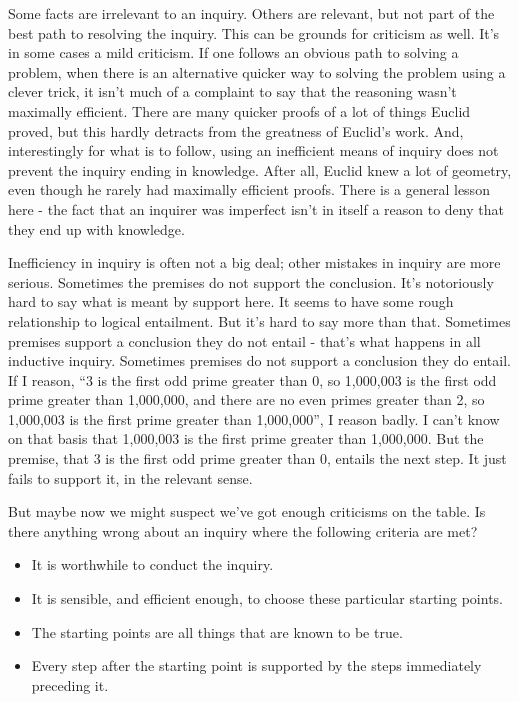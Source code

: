 \documentclass[
  11pt,
]{book}
\providecommand{\tightlist}{%
  \setlength{\itemsep}{0pt}\setlength{\parskip}{0pt}}
\begin{document}
Some facts are irrelevant to an inquiry. Others are relevant, but not part of the best path to resolving the inquiry. This can be grounds for criticism as well. It's in some cases a mild criticism. If one follows an obvious path to solving a problem, when there is an alternative quicker way to solving the problem using a clever trick, it isn't much of a complaint to say that the reasoning wasn't maximally efficient. There are many quicker proofs of a lot of things Euclid proved, but this hardly detracts from the greatness of Euclid's work. And, interestingly for what is to follow, using an inefficient means of inquiry does not prevent the inquiry ending in knowledge. After all, Euclid knew a lot of geometry, even though he rarely had maximally efficient proofs. There is a general lesson here - the fact that an inquirer was imperfect isn't in itself a reason to deny that they end up with knowledge.

Inefficiency in inquiry is often not a big deal; other mistakes in inquiry are more serious. Sometimes the premises do not support the conclusion. It's notoriously hard to say what is meant by support here. It seems to have some rough relationship to logical entailment. But it's hard to say more than that. Sometimes premises support a conclusion they do not entail - that's what happens in all inductive inquiry. Sometimes premises do not support a conclusion they do entail. If I reason, ``3 is the first odd prime greater than 0, so 1,000,003 is the first odd prime greater than 1,000,000, and there are no even primes greater than 2, so 1,000,003 is the first prime greater than 1,000,000'', I reason badly. I can't know on that basis that 1,000,003 is the first prime greater than 1,000,000. But the premise, that 3 is the first odd prime greater than 0, entails the next step. It just fails to support it, in the relevant sense.

But maybe now we might suspect we've got enough criticisms on the table. Is there anything wrong about an inquiry where the following criteria are met?

\begin{itemize}
\tightlist
\item
  It is worthwhile to conduct the inquiry.
\item
  It is sensible, and efficient enough, to choose these particular starting points.
\item
  The starting points are all things that are known to be true.
\item
  Every step after the starting point is supported by the steps immediately preceding it.
\end{itemize}
\end{document}
